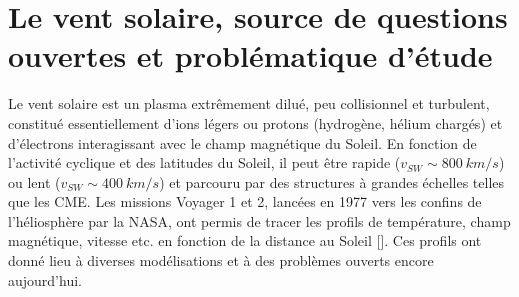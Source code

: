 \section{Le vent solaire, source de questions ouvertes et problématique d'étude} \label{sec-022}

Le vent solaire est un plasma extrêmement dilué, peu collisionnel et turbulent, constitué essentiellement d'ions légers ou protons (hydrogène, hélium chargés) et d'électrons interagissant avec le champ magnétique du Soleil. En fonction de l'activité cyclique et des latitudes du Soleil, il peut être rapide ($v_{SW} \sim \SI{800}{km/s}$) ou lent ($v_{SW} \sim \SI{400}{km/s}$) et parcouru par des structures à grandes échelles telles que les \ac{CME}. Les missions Voyager 1 et 2, lancées en 1977 vers les confins de l'héliosphère par la NASA, ont permis de tracer les profils de température, champ magnétique, vitesse etc. en fonction de la distance au Soleil [\cite{richardson_radial_1995}]. Ces profils ont donné lieu à diverses modélisations et à des problèmes ouverts encore aujourd'hui. 

